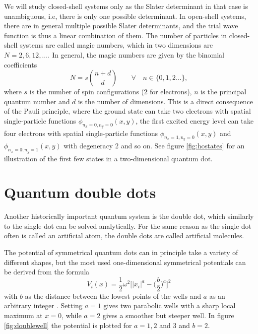 We will study closed-shell systems only as the Slater determinant in that case is unambiguous, i.e, there is only one possible determinant. In open-shell systems, there are in general multiple possible Slater determinants, and the trial wave function is thus a linear combination of them. The number of particles in closed-shell systems are called magic numbers, which in two dimensions are $N=2,6,12,\hdots$. In general, the magic numbers are given by the binomial coefficients
\begin{equation}
N=s\binom{n+d}{d} \quad\quad\forall\quad n\in\{0,1,2...\},
\label{eq:HOclosedshell}
\end{equation}
where $s$ is the number of spin configurations (2 for electrons), $n$ is the principal quantum number and $d$ is the number of dimensions. This is a direct consequence of the Pauli principle, where the ground state can take two electrons with spatial single-particle functions $\phi_{n_x=0,n_y=0}(x,y)$, the first excited energy level can take four electrons with spatial single-particle functions $\phi_{n_x=1,n_y=0}(x,y)$ and $\phi_{n_x=0,n_y=1}(x,y)$ with degeneracy 2 and so on. See figure \eqref{fig:hostates} for an illustration of the first few states in a two-dimensional quantum dot. 


%

\section{Quantum double dots} \label{sec:doubledots}
Another historically important quantum system is the double dot, which similarly to the single dot can be solved analytically. For the same reason as the single dot often is called an artificial atom, the double dots are called artificial molecules. 

The potential of symmetrical quantum dots can in principle take a variety of different shapes, but the most used one-dimensional symmetrical potentials can be derived from the formula
\begin{equation}
V_i(x)=\frac{1}{2}\omega^2\bigg[|x_i|^a-\Big(\frac{b}{2}\Big)^a\bigg]^2
\label{eq:doublewell}
\end{equation}
with $b$ as the distance between the lowest points of the wells and $a$ as an arbitrary integer \cite{jelic_double_2012}. Setting $a=1$ gives two parabolic wells with a sharp local maximum at $x=0$, while $a=2$ gives a smoother but steeper well. In figure \eqref{fig:doublewell} the potential is plotted for $a=1,2$ and $3$ and $b=2$.

